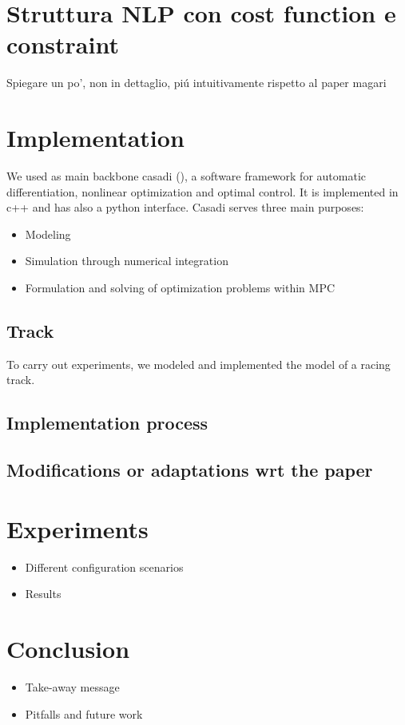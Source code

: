 \documentclass[a4paper, onecolumn, 11pt, twoside]{article}
\begin{document}
\section*{Struttura NLP con cost function e constraint}

Spiegare un po', non in dettaglio, piú intuitivamente rispetto al paper magari

\section*{Implementation}

We used as main backbone casadi (\cite{casadi}), a software framework for automatic
differentiation, nonlinear optimization and optimal control. It is implemented
in c++ and has also a python interface. Casadi serves three main purposes:
\begin{itemize}
    \item Modeling
    \item Simulation through numerical integration
    \item Formulation and solving of optimization problems within MPC
\end{itemize}

\subsection*{Track}

To carry out experiments, we modeled and implemented the model of a racing
track. 

\subsection*{Implementation process}

\subsection*{Modifications or adaptations wrt the paper}


\section*{Experiments}


\begin{itemize}
    \item Different configuration scenarios
    \item Results
\end{itemize}



\section*{Conclusion}

\begin{itemize}
    \item Take-away message
    \item Pitfalls and future work
\end{itemize}




\end{document}
